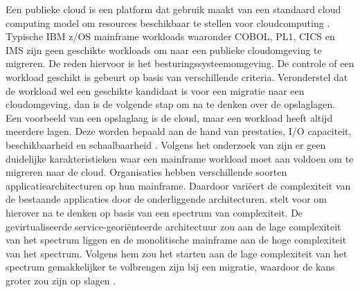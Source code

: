 Een publieke cloud is een platform dat gebruik maakt van een standaard cloud computing model om resources beschikbaar te stellen voor cloudcomputing \textcite{Allison2016}. Typische IBM z/OS mainframe workloads waaronder COBOL, PL1, CICS en IMS zijn geen geschikte workloads om naar een publieke cloudomgeving te migreren. De reden hiervoor is het besturingssysteemomgeving. De controle of een workload geschikt is gebeurt op basis van verschillende criteria. Veronderstel dat de workload wel een geschikte kandidaat is voor een migratie naar een cloudomgeving, dan is de volgende stap om na te denken over de opslaglagen. Een voorbeeld van een opslaglaag is de cloud, maar een workload heeft altijd meerdere lagen. Deze worden bepaald aan de hand van prestaties, I/O capaciteit, beschikbaarheid en schaalbaarheid \autocite{Allison2016}. Volgens het onderzoek van \citeauthor{Martikainen2018} zijn er geen duidelijke karakteristieken waar een mainframe workload moet aan voldoen om te migreren naar de cloud. Organisaties hebben verschillende soorten applicatiearchitecturen op hun mainframe. Daardoor variëert de complexiteit van de bestaande applicaties door de onderliggende architecturen. \citeauthor{Orban2016} stelt voor om hierover na te denken op basis van een spectrum van complexiteit. De gevirtualiseerde service-georiënteerde architectuur zou aan de lage complexiteit van het spectrum liggen en de monolitische mainframe aan de hoge complexiteit van het spectrum. Volgens hem zou het starten aan de lage complexiteit van het spectrum gemakkelijker te volbrengen zijn bij een migratie, waardoor de kans groter zou zijn op slagen \autocite{Orban2016}. 

